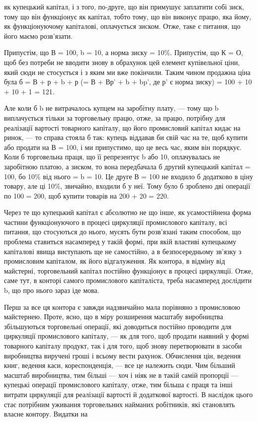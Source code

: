 \parcont{}  %
як купецький капітал, і з того, по-друге, що він примушує заплатити
собі зиск, тому що він функціонує як капітал, тобто
тому, що він виконує працю, яка йому, як функціонуючому капіталові,
оплачується зиском. Отже, таке є питання, що його маємо
розв’язати.

Припустім, що В = 100, b = 10, а норма зиску = 10\%. Припустім,
що К = О, щоб без потреби не вводити знову в обрахунок
цей елемент купівельної ціни, який сюди не стосується і з
яким ми вже покінчили. Таким чином продажна ціна була б =
В + р + b + р (= В + Вр' + b + bp', де р' є норма зиску) =
100 + 10 + 10 + 1 = 121.

Але коли б b не витрачалось купцем на заробітну плату, —
тому що b виплачується тільки за торговельну працю, отже, за
працю, потрібну для реалізації вартості товарного капіталу, що
його промисловий капітал кидає на ринок, — то справа стояла б
так: купець віддавав би свій час на те, щоб купити або продати
на В = 100, і ми припустимо, що це весь час, яким він порядкує.
Коли б торговельна праця, що її репрезентує b або 10,
оплачувалась не заробітною платою, а зиском, то вона передбачала
б другий купецький капітал = 100, бо 10\% від нього =
b = 10. Це друге В = 100 не входило б додатково в ціну товару,
але ці 10\%, звичайно, входили б у неї. Тому було б зроблено дві
операції по 100 = 200, щоб купити товарів на 200 + 20 = 220.

Через те що купецький капітал є абсолютно не що інше, як
усамостійнена форма частини функціонуючого в процесі циркуляції
промислового капіталу, всі питання, що стосуються до нього,
мусять бути розв’язані таким способом, що проблема ставиться
насамперед у такій формі, при якій властиві купецькому капіталові
явища виступають ще не самостійно, а в безпосередньому
зв’язку з промисловим капіталом, як його відгалуження. Як контора,
в відміну від майстерні, торговельний капітал постійно
функціонує в процесі циркуляції. Отже, саме тут, в конторі
самого промислового капіталіста, треба насамперед дослідити b,
що про нього зараз іде мова.

Перш за все ця контора є завжди надзвичайно мала порівняно
з промисловою майстернею. Проте, ясно, що в міру розширення
масштабу виробництва збільшуються торговельні операції,
які доводиться постійно проводити для циркуляції промислового
капіталу, — як для того, щоб продати наявний у формі
товарного капіталу продукт, так і для того, щоб знову перетворювати
в засоби виробництва виручені гроші і всьому вести рахунок.
Обчислення цін, ведення книг, ведення каси, кореспонденція,
— все це належить сюди. Чим більший масштаб виробництва,
тим більші — хоч і ніяк не в такій самій пропорції — купецькі операції
промислового капіталу, отже, тим більша є праця та інші
витрати циркуляції для реалізації вартості й додаткової вартості.
В наслідок цього стає потрібним уживання торговельних
найманих робітників, які становлять власне контору. Видатки на
\parbreak{}  %
